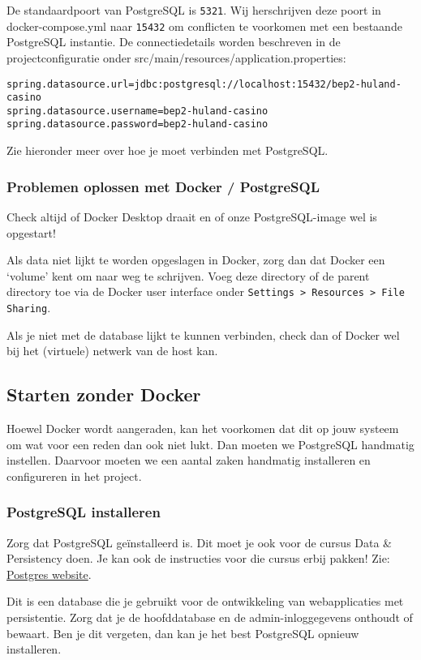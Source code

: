 De standaardpoort van PostgreSQL is \texttt{5321}. Wij herschrijven deze poort in docker-compose.yml
naar \texttt{15432} om conflicten te voorkomen met een bestaande PostgreSQL instantie. 
De connectiedetails worden beschreven in de projectconfiguratie onder src/main/resources/application.properties:

\begin{verbatim}
spring.datasource.url=jdbc:postgresql://localhost:15432/bep2-huland-casino
spring.datasource.username=bep2-huland-casino
spring.datasource.password=bep2-huland-casino
\end{verbatim}

Zie hieronder meer over hoe je moet verbinden met PostgreSQL.

\subsubsection{Problemen oplossen met Docker / PostgreSQL}
Check altijd of Docker Desktop draait en of onze PostgreSQL-image wel is opgestart!

Als data niet lijkt te worden opgeslagen in Docker, zorg dan dat Docker een `volume' kent om 
naar weg te schrijven. Voeg deze directory of de parent directory toe via de Docker user interface 
onder \texttt{Settings > Resources > File Sharing}.

Als je niet met de database lijkt te kunnen verbinden, check dan of Docker 
wel bij het (virtuele) netwerk van de host kan.

\subsection{Starten zonder Docker}
Hoewel Docker wordt aangeraden, kan het voorkomen dat dit op jouw systeem 
om wat voor een reden dan ook niet lukt. Dan moeten we PostgreSQL handmatig instellen.
Daarvoor moeten we een aantal zaken handmatig installeren en configureren in het project.

\subsubsection{PostgreSQL installeren}
Zorg dat PostgreSQL geïnstalleerd is. Dit moet je ook voor de cursus Data \& Persistency doen.
Je kan ook de instructies voor die cursus erbij pakken!
Zie: \href{https://www.postgresql.org/download/}{Postgres website}.

Dit is een database die je gebruikt voor de ontwikkeling van webapplicaties met persistentie.
Zorg dat je de hoofddatabase en de admin-inloggegevens onthoudt of bewaart.
Ben je dit vergeten, dan kan je het best PostgreSQL opnieuw installeren.

